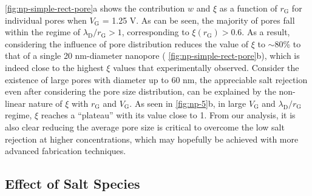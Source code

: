 \autoref{fig:np-simple-rect-pore}a shows the contribution $w$ and $\xi$ as
a function of $r_{\mathrm{G}}$ for individual pores when
$V_{\mathrm{G}}$ = 1.25 V. As can be seen, the majority of pores fall
within the regime of $\lambda_{\mathrm{D}} / r_{\mathrm{G}} > 1$,
corresponding to $\xi(r_{\mathrm{G}}) > 0.6$. As a result, considering
the influence of pore distribution reduces the value of $\xi$ to $\sim{}$80\% to
that of a single 20 nm-diameter nanopore (
\autoref{fig:np-simple-rect-pore}b), which is indeed close to the highest
$\xi$ values that experimentally observed.
%
Consider the existence of large pores with diameter up to 60 nm, the
appreciable salt rejection even after considering the pore size
distribution, can be explained by the non-linear nature of $\xi$ with
$r_{\mathrm{G}}$ and $V_{\mathrm{G}}$. As seen in \autoref{fig:np-5}b,
in large $V_{\mathrm{G}}$ and $\lambda_{\mathrm{D}} / r_{\mathrm{G}}$
regime, $\xi$ reaches a ``plateau'' with its value close to 1.
%
From our
analysis, it is also clear reducing the average pore size is critical
to overcome the low salt rejection at higher concentrations, which may
hopefully be achieved with more advanced fabrication techniques.


\subsection{Effect of Salt Species}
\label{sec:np-salts}

